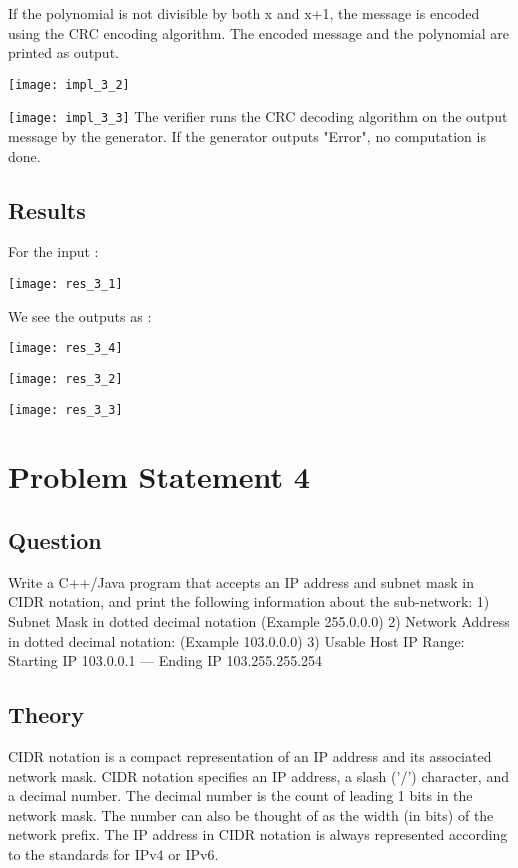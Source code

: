 \documentclass[11pt,a4paper]{article}
\begin{document}
If the polynomial is not divisible by both x and x+1, the message is encoded using the CRC encoding algorithm. The encoded message and the polynomial are printed as output.

\texttt{[image: impl\_3\_2]}

\texttt{[image: impl\_3\_3]}
The verifier runs the CRC decoding algorithm on the output message by the generator. If the generator outputs "Error", no computation is done.


\subsection{Results}\label{sec:results3}
For the input : 

\texttt{[image: res\_3\_1]}

We see the outputs as : 

\texttt{[image: res\_3\_4]}

\texttt{[image: res\_3\_2]}

\texttt{[image: res\_3\_3]}

\section{Problem Statement 4}\label{sec:problem4}
\subsection{Question}\label{sec:question4}
Write a C++/Java program that accepts an IP address and subnet mask in CIDR notation, and print the following information about the sub-network:
1) Subnet Mask in dotted decimal notation (Example 255.0.0.0)
2) Network Address in dotted decimal notation: (Example 103.0.0.0)
3) Usable Host IP Range: Starting IP 103.0.0.1 --- Ending IP 103.255.255.254

\subsection{Theory}\label{sec:theory4}
CIDR notation is a compact representation of an IP address and its associated network mask. CIDR notation specifies an IP address, a slash ('/') character, and a decimal number. The decimal number is the count of leading 1 bits in the network mask. The number can also be thought of as the width (in bits) of the network prefix. The IP address in CIDR notation is always represented according to the standards for IPv4 or IPv6.
\end{document}
